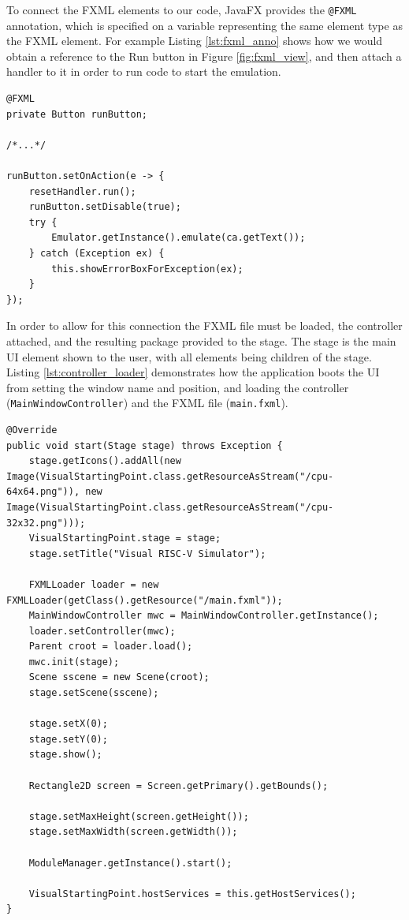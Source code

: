 To connect the FXML elements to our code, JavaFX \cite{sunmicrosystems_2022_javafx} provides the \texttt{@FXML} annotation, which is specified on a variable representing the same element type as the FXML element. For example Listing \ref{lst:fxml_anno} shows how we would obtain a reference to the Run button in Figure \ref{fig:fxml_view}, and then attach a handler to it in order to run code to start the emulation.

\begin{lstlisting}[caption=FXML annotation for a button, label=lst:fxml_anno]
@FXML
private Button runButton;

/*...*/

runButton.setOnAction(e -> {
    resetHandler.run();
    runButton.setDisable(true);
    try {
        Emulator.getInstance().emulate(ca.getText());
    } catch (Exception ex) {
        this.showErrorBoxForException(ex);
    }
});
\end{lstlisting}

In order to allow for this connection the FXML file must be loaded, the controller attached, and the resulting package provided to the stage. The stage is the main \ac{UI} element shown to the user, with all elements being children of the stage. Listing \ref{lst:controller_loader} demonstrates how the application boots the \ac{UI} from setting the window name and position, and loading the controller (\texttt{MainWindowController}) and the FXML file (\texttt{main.fxml}).

\begin{lstlisting}[caption=\ac{UI} starting point, label=lst:controller_loader]
@Override
public void start(Stage stage) throws Exception {
    stage.getIcons().addAll(new Image(VisualStartingPoint.class.getResourceAsStream("/cpu-64x64.png")), new Image(VisualStartingPoint.class.getResourceAsStream("/cpu-32x32.png")));
    VisualStartingPoint.stage = stage;
    stage.setTitle("Visual RISC-V Simulator");

    FXMLLoader loader = new FXMLLoader(getClass().getResource("/main.fxml"));
    MainWindowController mwc = MainWindowController.getInstance();
    loader.setController(mwc);
    Parent croot = loader.load();
    mwc.init(stage);
    Scene sscene = new Scene(croot);
    stage.setScene(sscene);

    stage.setX(0);
    stage.setY(0);
    stage.show();

    Rectangle2D screen = Screen.getPrimary().getBounds();

    stage.setMaxHeight(screen.getHeight());
    stage.setMaxWidth(screen.getWidth());

    ModuleManager.getInstance().start();

    VisualStartingPoint.hostServices = this.getHostServices();
}
\end{lstlisting}

